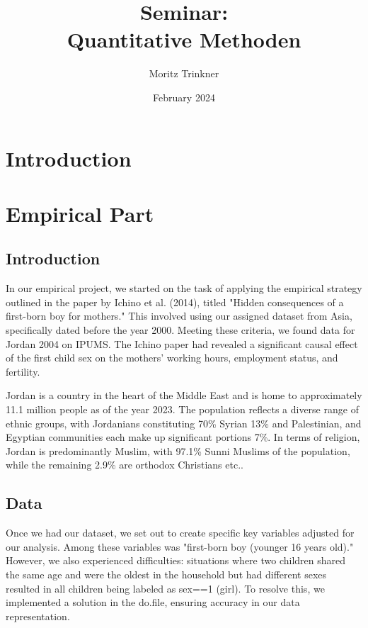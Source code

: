 \documentclass[12pt,draft,a4paper]{article}
\begin{document}
    
\begin{titlepage}

    \author{Moritz Trinkner}
    \title{Seminar:\\ Quantitative Methoden}
    \date{February 2024}
\end{titlepage}
\maketitle
\thispagestyle{empty}
\newpage
\tableofcontents
\thispagestyle{empty}
\newpage
\setcounter{page}{1}

\section{Introduction}

\newpage
\section{Empirical Part}
\subsection{Introduction} 

In our empirical project, we started on the task of applying the empirical strategy outlined in the paper by Ichino et al. (2014), titled "Hidden consequences of a first-born boy for mothers." This involved using our assigned dataset from Asia, specifically dated before the year 2000. Meeting these criteria, we found data for Jordan 2004 on IPUMS. The Ichino paper had revealed a significant causal effect of the first child sex on the mothers' working hours, employment status, and fertility.

Jordan is a country in the heart of the Middle East and is home to approximately 11.1 million people as of the year 2023. The population reflects a diverse range of ethnic groups, with Jordanians constituting 70\% Syrian 13\% and Palestinian, and Egyptian communities each make up significant portions 7\%. In terms of religion, Jordan is predominantly Muslim, with 97.1\% Sunni Muslims of the population, while the remaining 2.9\% are orthodox Christians etc..


\subsection{Data}

Once we had our dataset, we set out to create specific key variables adjusted for our analysis. Among these variables was "first-born boy (younger 16 years old)." However, we also experienced difficulties: situations where two children shared the same age and were the oldest in the household but had different sexes resulted in all children being labeled as sex==1 (girl). To resolve this, we implemented a solution in the do.file, ensuring accuracy in our data representation.
\end{document}
